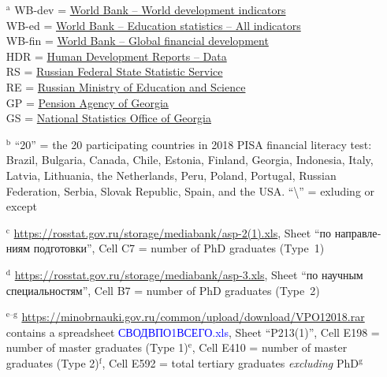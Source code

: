 \begin{singlespace} \small
\begin{itemize}
    \item[$^\text{a}$] WB-dev = \href{https://databank.worldbank.org/source/world-development-indicators}{World Bank -- World development indicators}\\
        WB-ed = \href{https://databank.worldbank.org/source/education-statistics-^-all-indicators}{World Bank -- Education statistics -- All indicators}\\
        WB-fin = \href{https://databank.worldbank.org/source/global-financial-development}{World Bank -- Global financial development}\\
        HDR = \href{http://hdr.undp.org/en/data}{Human Development Reports -- Data}\\
        RS = \href{https://rosstat.gov.ru/}{Russian Federal State Statistic Service}\\
        RE = \href{https://minobrnauki.gov.ru}{Russian Ministry of Education and Science}\\
        GP = \href{https://www.pensions.ge}{Pension Agency of Georgia}\\
        GS = \href{https://www.geostat.ge}{National Statistics Office of Georgia}
    \item[$^\text{b}$] ``20'' = the 20 participating countries in 2018 \textsc{PISA} financial literacy test: Brazil, Bulgaria, Canada, Chile, Estonia, Finland, Georgia, Indonesia, Italy, Latvia, Lithuania, the Netherlands, Peru, Poland, Portugal, Russian Federation, Serbia, Slovak Republic, Spain, and the USA. ``\textbackslash'' = exluding or except
    \item[$^\text{c}$] \href{https://rosstat.gov.ru/storage/mediabank/asp-2(1).xls}{https://rosstat.gov.ru/storage/mediabank/asp-2(1).xls}, Sheet ``\foreignlanguage{russian}{по направлениям подготовки}'', Cell C7 = number of PhD graduates \mbox{(Type 1)}
    \item[$^\text{d}$] \href{https://rosstat.gov.ru/storage/mediabank/asp-3.xls}{https://rosstat.gov.ru/storage/mediabank/asp-3.xls}, Sheet ``\foreignlanguage{russian}{по научным специальностям}'', Cell B7 = number of PhD graduates \mbox{(Type 2)}
    \item[$^\text{e--g}$] \href{https://minobrnauki.gov.ru/common/upload/download/VPO_1_2018.rar}{https://minobrnauki.gov.ru/common/upload/download/VPO{\textunderscore}1{\textunderscore}2018.rar} contains a spreadsheet \textcolor{blue}{\foreignlanguage{russian}{СВОД{\textunderscore}ВПО1{\textunderscore}ВСЕГО}.xls}, Sheet ``P2{\textunderscore}1{\textunderscore}3(1)'', Cell E198 = number of master graduates (Type 1)$^\text{e}$, Cell E410 = number of master graduates (Type 2)$^\text{f}$, Cell E592 = total tertiary graduates \emph{excluding} PhD$^\text{g}$

\end{itemize}
\end{singlespace}
